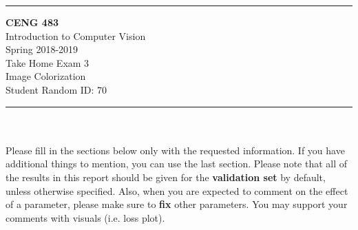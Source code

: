 \documentclass[12pt]{article}
\newcommand{\HRule}{\rule{\linewidth}{1mm}}
\begin{document}
\noindent
\HRule %
\small
\begin{center}
	\LARGE \textbf{CENG 483} \\[4mm]
	\Large Introduction to Computer Vision \\[4mm]
	\normalsize Spring 2018-2019 \\
	\Large Take Home Exam 3 \\
	\Large Image Colorization \\
    \Large Student Random ID: 70 \\
\end{center}
\HRule

\begin{center}
\end{center}
\vspace{-10mm}
\noindent\\ \\ 
Please fill in the sections below only with the requested information. If you have additional things to mention, you can use the last section. Please note that all of the results in this report should be given for the \textbf{validation set} by default, unless otherwise specified. Also, when you are expected to comment on the effect of a parameter, please make sure to \textbf{fix} other parameters. You may support your comments with visuals (i.e. loss plot).
\end{document}
